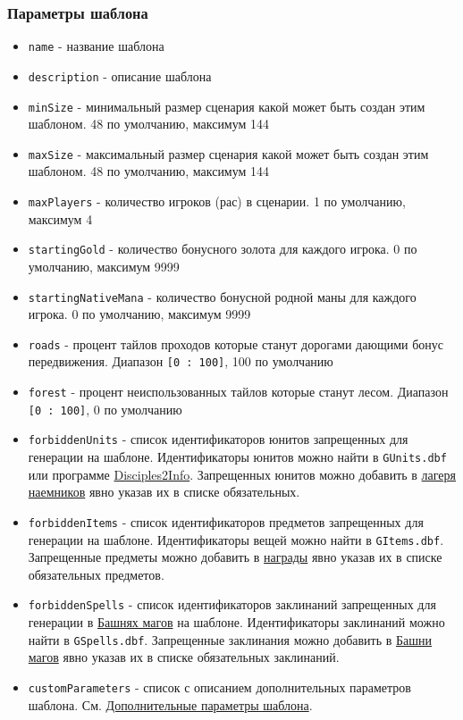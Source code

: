 \subsubsection{Параметры шаблона}
\begin{itemize}
\item \texttt{name} - название шаблона
\item \texttt{description} - описание шаблона
\item \texttt{minSize} - минимальный размер сценария какой может быть создан этим шаблоном. 48 по умолчанию, максимум 144
\item \texttt{maxSize} - максимальный размер сценария какой может быть создан этим шаблоном. 48 по умолчанию, максимум 144
\item \texttt{maxPlayers} - количество игроков (рас) в сценарии. 1 по умолчанию, максимум 4
\item \texttt{startingGold} - количество бонусного золота для каждого игрока. 0 по умолчанию, максимум 9999
\item \texttt{startingNativeMana} - количество бонусной родной маны для каждого игрока. 0 по умолчанию, максимум 9999
\item \texttt{roads} - процент тайлов проходов которые станут дорогами дающими бонус передвижения. Диапазон \texttt{[0 : 100]}, 100 по умолчанию
\item \texttt{forest} - процент неиспользованных тайлов которые станут лесом. Диапазон \texttt{[0 : 100]}, 0 по умолчанию

\item \texttt{forbiddenUnits} - список идентификаторов юнитов запрещенных для генерации на шаблоне.
Идентификаторы юнитов можно найти в \texttt{GUnits.dbf} или программе
\href{https://drive.google.com/file/d/1hI7OYhoQbeizglwZwY8UuWSSr6Q1i6WO/view}{Disciples2Info}.
Запрещенных юнитов можно добавить в \hyperref[mercenary]{лагеря наемников} явно указав их в списке обязательных.

\item \texttt{forbiddenItems} - список идентификаторов предметов запрещенных для генерации на шаблоне.
Идентификаторы вещей можно найти в \texttt{GItems.dbf}.
Запрещенные предметы можно добавить в \hyperref[loot]{награды} явно указав их в списке обязательных предметов.

\item \texttt{forbiddenSpells} - список идентификаторов заклинаний запрещенных для генерации в \hyperref[mage]{Башнях магов} на шаблоне.
Идентификаторы заклинаний можно найти в \texttt{GSpells.dbf}.
Запрещенные заклинания можно добавить в \hyperref[mage]{Башни магов} явно указав их в списке обязательных заклинаний.

\item \texttt{customParameters} - список с описанием дополнительных параметров шаблона. См. \hyperref[customParameters]{Дополнительные параметры шаблона}.
\end{itemize}

